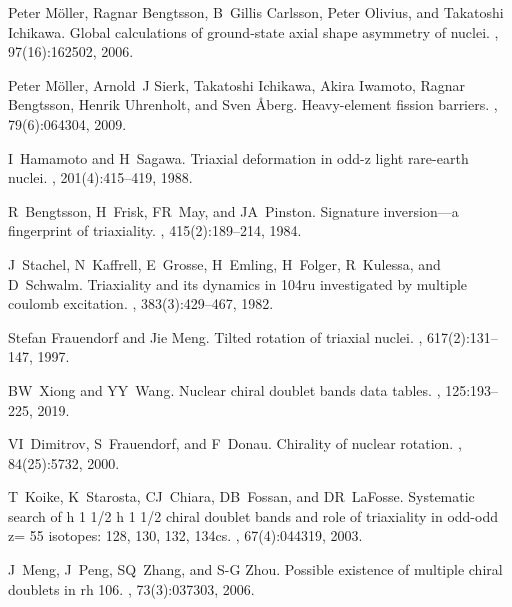 \documentclass[11pt]{article}
\begin{document}
\begin{thebibliography}{99}

Peter M{\"o}ller, Ragnar Bengtsson, B~Gillis Carlsson, Peter Olivius, and
  Takatoshi Ichikawa.
\newblock Global calculations of ground-state axial shape asymmetry of nuclei.
, 97(16):162502, 2006.

Peter M{\"o}ller, Arnold~J Sierk, Takatoshi Ichikawa, Akira Iwamoto, Ragnar
  Bengtsson, Henrik Uhrenholt, and Sven {\AA}berg.
\newblock Heavy-element fission barriers.
, 79(6):064304, 2009.

I~Hamamoto and H~Sagawa.
\newblock Triaxial deformation in odd-z light rare-earth nuclei.
, 201(4):415--419, 1988.

R~Bengtsson, H~Frisk, FR~May, and JA~Pinston.
\newblock Signature inversion—a fingerprint of triaxiality.
, 415(2):189--214, 1984.

J~Stachel, N~Kaffrell, E~Grosse, H~Emling, H~Folger, R~Kulessa, and D~Schwalm.
\newblock Triaxiality and its dynamics in 104ru investigated by multiple
  coulomb excitation.
, 383(3):429--467, 1982.

Stefan Frauendorf and Jie Meng.
\newblock Tilted rotation of triaxial nuclei.
, 617(2):131--147, 1997.

BW~Xiong and YY~Wang.
\newblock Nuclear chiral doublet bands data tables.
, 125:193--225, 2019.

VI~Dimitrov, S~Frauendorf, and F~Donau.
\newblock Chirality of nuclear rotation.
, 84(25):5732, 2000.

T~Koike, K~Starosta, CJ~Chiara, DB~Fossan, and DR~LaFosse.
\newblock Systematic search of h 1 1/2 h 1 1/2 chiral doublet bands and role of
  triaxiality in odd-odd z= 55 isotopes: 128, 130, 132, 134cs.
, 67(4):044319, 2003.

J~Meng, J~Peng, SQ~Zhang, and S-G Zhou.
\newblock Possible existence of multiple chiral doublets in rh 106.
, 73(3):037303, 2006.


\end{thebibliography}
\end{document}
